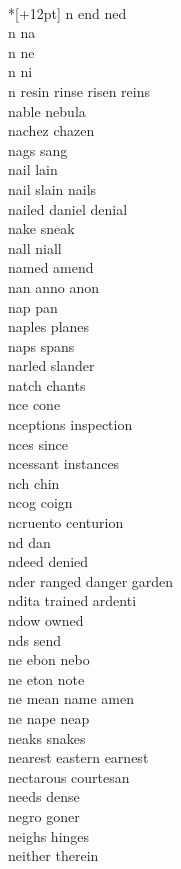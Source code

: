 \vspace{14pt}
\noindent\notextbf{\LargeN}\\*[+12pt]
n end ned  \\
n na \\
n ne \\
n ni \\
n resin rinse risen reins    \\
nable nebula \\
nachez chazen\\
nags sang\\
nail lain\\
nail slain nails \\
nailed daniel denial\\
nake sneak \\
nall niall \\
named amend\\
nan anno anon \\
nap pan\\
naples planes\\
naps spans \\
narled slander \\
natch chants \\
nce cone \\
nceptions inspection \\
nces since \\
ncessant instances \\
nch chin \\
ncog coign \\
ncruento centurion \\
nd dan \\
ndeed denied \\
nder ranged danger garden  \\
ndita trained ardenti  \\
ndow owned \\
nds send \\
ne ebon nebo  \\
ne eton note  \\
ne mean name amen  \\
ne nape neap  \\
neaks snakes \\
nearest eastern earnest\\
nectarous courtesan\\
needs dense\\
negro goner\\
neighs hinges\\
neither therein\\

